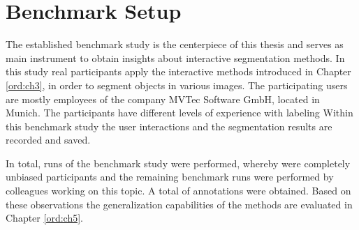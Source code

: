 
\chapter{Benchmark Setup}\label{ord:ch4}

The established benchmark study is the centerpiece of this thesis and serves as main instrument to obtain insights about interactive segmentation methods.
In this study real participants apply the interactive methods introduced in Chapter \ref{ord:ch3}, in order to segment objects in various images.
The participating users are mostly employees of the company MVTec Software GmbH, located in Munich.
The participants have different levels of experience with labeling
Within this benchmark study the user interactions and the segmentation results are recorded and saved.

In total, \getNumberBenchmarkRuns \space runs of the benchmark study were performed, whereby \getNumberBenchmarkParticipants \space were completely unbiased participants and the remaining benchmark runs were performed by colleagues working on this topic.
A total of \getNumberBenchmarkAnnotations \space annotations were obtained.
Based on these observations the generalization capabilities of the methods are evaluated in Chapter \ref{ord:ch5}.






